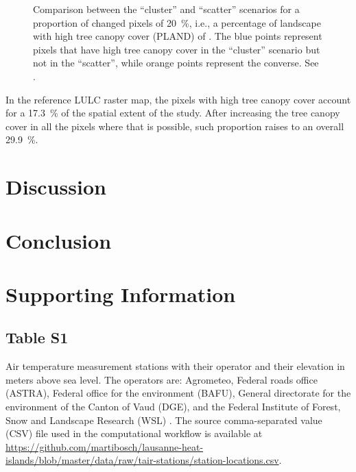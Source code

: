 \documentclass[10pt,letterpaper]{article}
\begin{document}
\begin{figure}[ht]
  \begin{adjustwidth}{-.4\textwidth}{0cm}
    \centering
    \caption{\label{fig:scenario-maps} Comparison between the ``cluster'' and ``scatter'' scenarios for a proportion of changed pixels of 20~\%, i.e., a percentage of landscape with high tree canopy cover (PLAND) of . The blue points represent pixels that have high tree canopy cover in the ``cluster'' scenario but not in the ``scatter'', while orange points represent the converse. See .}
  \end{adjustwidth}
\end{figure}
  
In the reference LULC raster map, the pixels with high tree canopy cover account for a 17.3~\% of the spatial extent of the study. After increasing the tree canopy cover in all the pixels where that is possible, such proportion raises to an overall 29.9~\%.


\section*{Discussion}



\section*{Conclusion}


\section*{Supporting Information}

\subsection*{Table S1}
\label{table-station-locations}

Air temperature measurement stations with their operator and their elevation in meters above sea level. The operators are: Agrometeo, Federal roads office (ASTRA), Federal office for the environment (BAFU), General directorate for the environment of the Canton of Vaud (DGE), and the Federal Institute of Forest, Snow and Landscape Research (WSL) \cite{rebetez2018meteorological}. The source comma-separated value (CSV) file used in the computational workflow is available at \url{https://github.com/martibosch/lausanne-heat-islands/blob/master/data/raw/tair-stations/station-locations.csv}.
\end{document}
